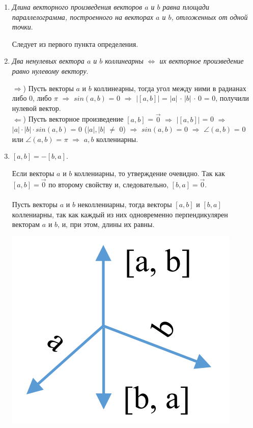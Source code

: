 \begin{enumerate}
	\item \textit{Длина векторного произведения векторов $a$ и $b$ равна площади параллелограмма, построенного на векторах $a$ и $b$, отложенных от одной точки}.\begin{Proof}
		Следует из первого пункта определения.
	\end{Proof}
	\item \textit{Два ненулевых вектора $a$ и $b$ коллинеарны $\Longleftrightarrow$ их векторное произведение равно нулевому вектору}.
	\begin{Proof}
		$\Rightarrow$) Пусть векторы $a$ и $b$ коллинеарны, тогда угол между ними в радианах либо 0, либо $\pi$ $\Rightarrow$ $sin (a, b)$ = 0 $\Rightarrow$ $|[a, b]|$ = $|a|$ $\cdot$ $|b|$ $\cdot$ 0 = 0, получили нулевой вектор. \\
		$\Leftarrow$) Пусть векторное произведение $[a, b]$ = $\overrightarrow{0}$ $\Rightarrow$ $|[a, b]|$ = 0 $\Rightarrow$ $|a| \cdot|b|\cdot sin(a, b)$ = 0 ($|a|, |b|$ $\not=$ 0) $\Rightarrow$ $sin (a, b)$ = 0 $\Rightarrow$ $\angle$$(a, b)$ = 0 или $\angle$$(a, b)$ = $\pi$ $\Rightarrow$ $a, b$ коллениарны.
	\end{Proof}
	\item $[a, b] = - [b, a]$.
	\begin{Proof}
		Если векторы $a$ и $b$ коллениарны, то утверждение очевидно. Так как $[a, b]=\overrightarrow{0}$ по второму свойству и, следовательно, $[b, a]=\overrightarrow{0}$.\\\\
		Пусть векторы $a$ и $b$ неколлениарны, тогда векторы $[a, b]$ и $[b, a]$ коллениарны, так как каждый из них одновременно перпендикулярен векторам $a$ и $b$, и, при этом, длины их равны. \begin{center}
			\includegraphics[scale=0.3]{images/vecs_3_5.png}

\end{center}
\end{Proof}
\end{enumerate}
